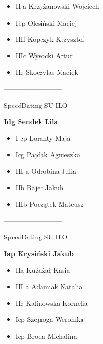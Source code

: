 \documentclass[a4paper,10pt]{article}
\begin{document}
\begin{multicols}{3}
\begin{minipage}[l]{\textwidth}
  \begin{itemize}
    \item II a Krzyżanowski Wojciech
    \item Ibp Olesiński Maciej
    \item IIIf Kopczyk Krzysztof
    \item IIIc Wysocki Artur
    \item IIe Skoczylas Maciek

    \end{itemize}



\end{minipage}



\begin{minipage}[l]{\textwidth}
--------------------------

  \footnotesize{SpeedDating SU ILO}

  \bfseries{Idg Sendek Lila}

  \begin{itemize}
    \item I cp Loranty Maja
    \item Icg Pajdak Agnieszka
    \item III a Odrobina Julia
    \item IIb Bajer Jakub
    \item IIIb Początek Mateusz

    \end{itemize}



\end{minipage}



\begin{minipage}[l]{\textwidth}
--------------------------

  \footnotesize{SpeedDating SU ILO}

  \bfseries{Iap Krysiński Jakub}

  \begin{itemize}
    \item IIa Kużdżał Kasia
    \item III a Adamiak Natalia
    \item IIc Kalinowska Kornelia
    \item Iep Szejnoga Weronika
    \item Icp Broda Michalina

    \end{itemize}




\end{minipage}
\end{multicols}
\end{document}
